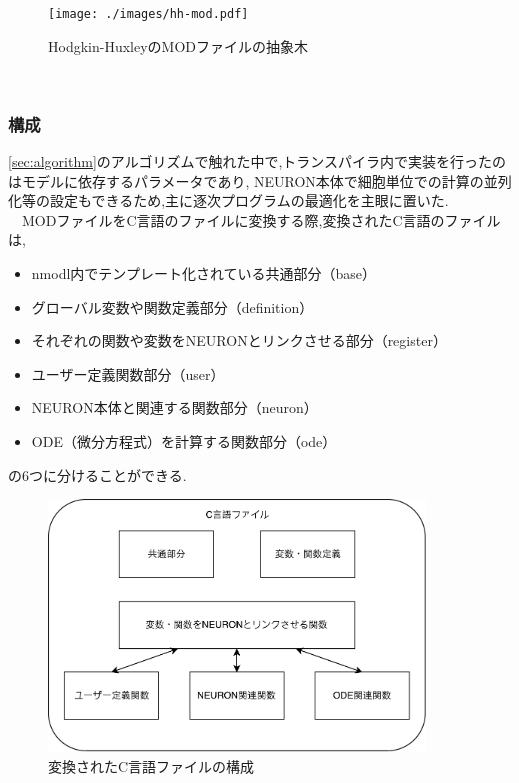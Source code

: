 \begin{figure}[htb]
  \begin{center}
    \texttt{[image: ./images/hh-mod.pdf]}
    \caption{Hodgkin-HuxleyのMODファイルの抽象木}
    \label{fig:hh-mod-ast}
  \end{center}
\end{figure}~\\
\clearpage

\subsubsection{構成}
\ref{sec:algorithm}のアルゴリズムで触れた中で,トランスパイラ内で実装を行ったのはモデルに依存するパラメータであり,
NEURON本体で細胞単位での計算の並列化等の設定もできるため,主に逐次プログラムの最適化を主眼に置いた.\\
　MODファイルをC言語のファイルに変換する際,変換されたC言語のファイルは,\\
\begin{itemize}
\item nmodl内でテンプレート化されている共通部分（base）
\item グローバル変数や関数定義部分（definition）
\item それぞれの関数や変数をNEURONとリンクさせる部分（register）
\item ユーザー定義関数部分（user）
\item NEURON本体と関連する関数部分（neuron）
\item ODE（微分方程式）を計算する関数部分（ode）
\end{itemize}
の6つに分けることができる.\\

\begin{figure}[htb]
  \begin{center}
    \includegraphics[width=10.0cm]{./images/transpiler-c-file.pdf}
    \caption{変換されたC言語ファイルの構成}
    \label{fig:transpiler}
  \end{center}
\end{figure}~\\


